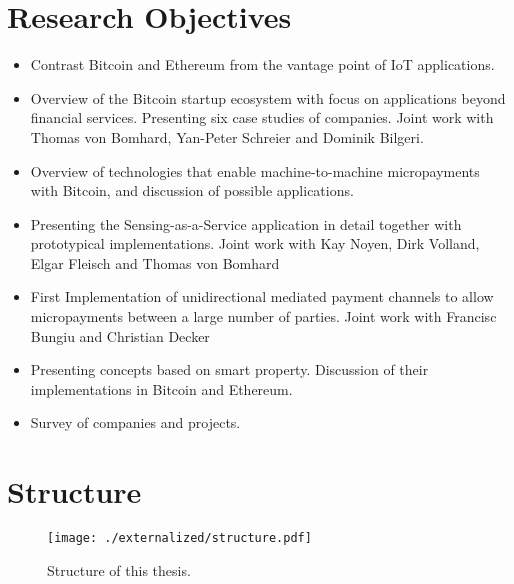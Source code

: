 \section{Research Objectives}


 

\begin{itemize}
\item{Contrast Bitcoin and Ethereum from the vantage point of IoT applications.}
\item{Overview of the Bitcoin startup ecosystem with focus on applications beyond financial services. Presenting six case studies of companies. Joint work with Thomas von Bomhard, Yan-Peter Schreier and Dominik Bilgeri.}
\item{Overview of technologies that enable machine-to-machine micropayments with Bitcoin, and discussion of possible applications.}
\item{Presenting the Sensing-as-a-Service application in detail together with prototypical implementations. Joint work with Kay Noyen, Dirk Volland, Elgar Fleisch and Thomas von Bomhard}
\item{First Implementation of unidirectional mediated payment channels to allow micropayments between a large number of parties. Joint work with Francisc Bungiu and Christian Decker}
\item{Presenting concepts based on smart property. Discussion of their implementations in Bitcoin and Ethereum.}
\item{Survey of companies and projects.}
\end{itemize}

\newpage
\section{Structure}

\begin{figure}
\centering
\texttt{[image: ./externalized/structure.pdf]}
\caption{Structure of this thesis.}
\label{fig:structure}
\end{figure}
